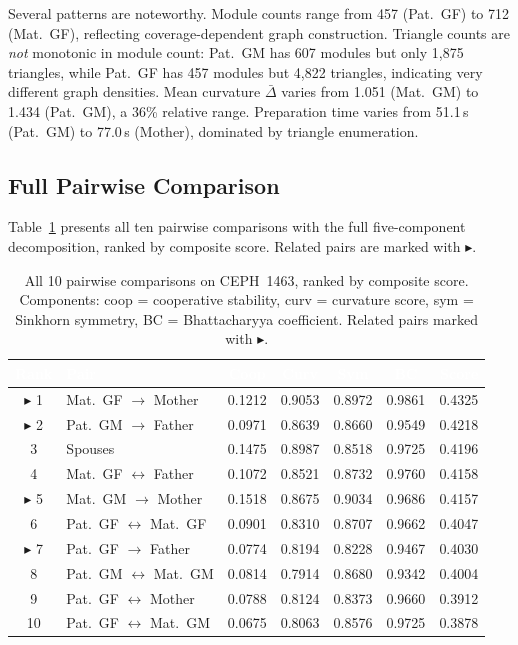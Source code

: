 \documentclass{../yalumba}
\begin{document}
Several patterns are noteworthy.  Module counts range from 457 (Pat.~GF)
to 712 (Mat.~GF), reflecting coverage-dependent graph construction.
Triangle counts are \emph{not} monotonic in module count: Pat.~GM has 607
modules but only 1{,}875 triangles, while Pat.~GF has 457 modules but
4{,}822 triangles, indicating very different graph densities.  Mean
curvature $\bar\Delta$ varies from 1.051 (Mat.~GM) to 1.434 (Pat.~GM),
a 36\% relative range.  Preparation time varies from 51.1\,s (Pat.~GM)
to 77.0\,s (Mother), dominated by triangle enumeration.

\subsection{Full Pairwise Comparison}

Table~\ref{tab:pairs} presents all ten pairwise comparisons with the
full five-component decomposition, ranked by composite score.  Related
pairs are marked with $\blacktriangleright$.

\begin{table}[htbp]
\centering
\tablestyle
\caption{All 10 pairwise comparisons on CEPH~1463, ranked by composite
score.  Components: coop = cooperative stability, curv = curvature
score, sym = Sinkhorn symmetry, BC = Bhattacharyya coefficient.
Related pairs marked with $\blacktriangleright$.}
\label{tab:pairs}
\small
\begin{tabular}{@{}clccccr@{}}
\toprule
\rowcolor{table-header}
\textcolor{white}{\textbf{Rank}} &
\textcolor{white}{\textbf{Pair}} &
\textcolor{white}{\textbf{Coop}} &
\textcolor{white}{\textbf{Curv}} &
\textcolor{white}{\textbf{Sym}} &
\textcolor{white}{\textbf{BC}} &
\textcolor{white}{\textbf{Score}} \\
\midrule
$\blacktriangleright$ 1
  & Mat.~GF $\to$ Mother
  & 0.1212 & 0.9053 & 0.8972 & 0.9861 & 0.4325 \\
$\blacktriangleright$ 2
  & Pat.~GM $\to$ Father
  & 0.0971 & 0.8639 & 0.8660 & 0.9549 & 0.4218 \\
3 & Spouses
  & 0.1475 & 0.8987 & 0.8518 & 0.9725 & 0.4196 \\
4 & Mat.~GF $\leftrightarrow$ Father
  & 0.1072 & 0.8521 & 0.8732 & 0.9760 & 0.4158 \\
$\blacktriangleright$ 5
  & Mat.~GM $\to$ Mother
  & 0.1518 & 0.8675 & 0.9034 & 0.9686 & 0.4157 \\
6 & Pat.~GF $\leftrightarrow$ Mat.~GF
  & 0.0901 & 0.8310 & 0.8707 & 0.9662 & 0.4047 \\
$\blacktriangleright$ 7
  & Pat.~GF $\to$ Father
  & 0.0774 & 0.8194 & 0.8228 & 0.9467 & 0.4030 \\
8 & Pat.~GM $\leftrightarrow$ Mat.~GM
  & 0.0814 & 0.7914 & 0.8680 & 0.9342 & 0.4004 \\
9 & Pat.~GF $\leftrightarrow$ Mother
  & 0.0788 & 0.8124 & 0.8373 & 0.9660 & 0.3912 \\
10 & Pat.~GF $\leftrightarrow$ Mat.~GM
  & 0.0675 & 0.8063 & 0.8576 & 0.9725 & 0.3878 \\
\bottomrule
\end{tabular}
\end{table}
\end{document}
